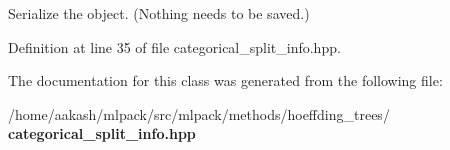 Serialize the object. (Nothing needs to be saved.) 



Definition at line 35 of file categorical\+\_\+split\+\_\+info.\+hpp.



The documentation for this class was generated from the following file\+:\begin{DoxyCompactItemize}
\item 
/home/aakash/mlpack/src/mlpack/methods/hoeffding\+\_\+trees/\textbf{ categorical\+\_\+split\+\_\+info.\+hpp}\end{DoxyCompactItemize}
